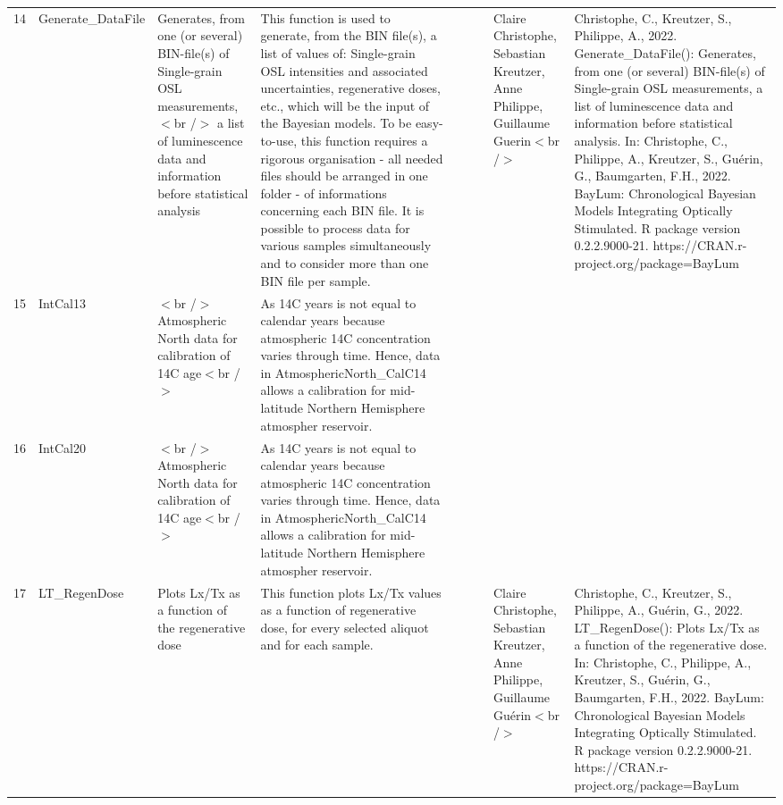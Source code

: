 \begin{table}[ht]
\begin{tabular}{rllllllll}
 \\ 
  14 & Generate\_DataFile & Generates, from one (or several) BIN-file(s) of Single-grain OSL measurements,$<$br /$>$ a list of luminescence data and information before statistical analysis & This function is used to generate, from the BIN file(s), a list of values of: Single-grain  OSL intensities and associated uncertainties, regenerative doses, etc., which will be the input of the Bayesian models. To be easy-to-use, this function requires a rigorous organisation - all needed files should be arranged in one folder - of informations concerning each BIN file.   It is possible to process data for various samples simultaneously and to consider more than one BIN file per sample. &  &  &  & Claire Christophe, Sebastian Kreutzer, Anne Philippe, Guillaume Guerin$<$br /$>$ & Christophe, C., Kreutzer, S., Philippe, A., 2022. Generate\_DataFile(): Generates, from one (or several) BIN-file(s) of Single-grain OSL measurements, a list of luminescence data and information before statistical analysis. In: Christophe, C., Philippe, A., Kreutzer, S., Guérin, G., Baumgarten, F.H., 2022. BayLum: Chronological Bayesian Models Integrating Optically Stimulated. R package version 0.2.2.9000-21. https://CRAN.r-project.org/package=BayLum
 \\ 
  15 & IntCal13 & $<$br /$>$ Atmospheric North data for calibration of 14C age$<$br /$>$ & As 14C years is not equal to calendar years because atmospheric 14C concentration varies through time. Hence, data in AtmosphericNorth\_CalC14 allows a calibration for mid-latitude Northern Hemisphere atmospher reservoir. &  &  &  &  &  \\ 
  16 & IntCal20 & $<$br /$>$ Atmospheric North data for calibration of 14C age$<$br /$>$ & As 14C years is not equal to calendar years because atmospheric 14C concentration varies through time. Hence, data in AtmosphericNorth\_CalC14 allows a calibration for mid-latitude Northern Hemisphere atmospher reservoir. &  &  &  &  &  \\ 
  17 & LT\_RegenDose & Plots Lx/Tx as a function of the regenerative dose & This function plots  Lx/Tx  values as a function of regenerative dose, for every selected aliquot and for each sample. &  &  &  & Claire Christophe, Sebastian Kreutzer, Anne Philippe, Guillaume Guérin$<$br /$>$ & Christophe, C., Kreutzer, S., Philippe, A., Guérin, G., 2022. LT\_RegenDose(): Plots Lx/Tx as a function of the regenerative dose. In: Christophe, C., Philippe, A., Kreutzer, S., Guérin, G., Baumgarten, F.H., 2022. BayLum: Chronological Bayesian Models Integrating Optically Stimulated. R package version 0.2.2.9000-21. https://CRAN.r-project.org/package=BayLum

\end{tabular}
\end{table}
